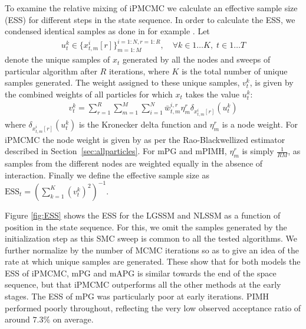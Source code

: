 To examine the relative mixing of iPMCMC we calculate an effective sample size (ESS) for different steps in the state sequence.  In order to calculate the ESS, we condensed identical samples as done in for example \cite{vandemeent_aistats_2015}.  Let 
\begin{align*}
u_{t}^k \in \{x_{t,m}^{i}[r]\}^{i=1:N,r=1:R}_{m=1:M}, \quad \forall k \in 1 \dots K, \; t \in 1 \dots T
\end{align*} 
denote the unique samples of $x_t$ generated by all the nodes and sweeps of particular algorithm after $R$ iterations, where $K$ is the total number of unique samples generated.  The weight assigned to these unique samples, $v_t^{k}$, is given by the combined weights of all particles for which $x_t$ takes the value $u_{t}^k$:
\begin{align}
v_t^{k} = \sum_{r=1}^{R} \sum_{m=1}^{M} \sum_{i=1}^{N} \bar{w}_{t,m}^{i,r} \eta_{m}^{r} \delta_{x_{t,m}^{i}[r]}(u_{t}^{k})
\end{align}
where $\delta_{x_{t,m}^{i}[r]}(u_{t}^{k})$ is the Kronecker delta function and $\eta_{m}^{r}$ is a node weight.  For iPMCMC the node weight is given by as per the Rao-Blackwellized estimator described in Section~\ref{sec:allparticles}. For mPG and mPIMH, $\eta_{m}^{r}$ is simply $\frac{1}{RM}$,
as samples from the different nodes are weighted equally in the absence of interaction. 
Finally we define the effective sample size as $\text{ESS}_t = \left(\textstyle\sum_{k=1}^K \left(v_t^{k}\right)^2\right)^{-1}$.

Figure \ref{fig:ESS} shows the ESS for the LGSSM and NLSSM as a function of position in the state sequence.  For this, we omit the samples generated by the initialization step as this SMC sweep is common to all the tested algorithms.  We further normalize by the number of MCMC iterations so as to give an idea of the rate at which unique samples are generated.  These show that for both models the ESS of iPMCMC, mPG and mAPG is similar towards the end of the space sequence, but that iPMCMC outperforms all the other methods at the early stages. The ESS of mPG was particularly poor at early iterations.  PIMH performed poorly throughout, reflecting the very low observed acceptance ratio of around $7.3\%$ on average. 

